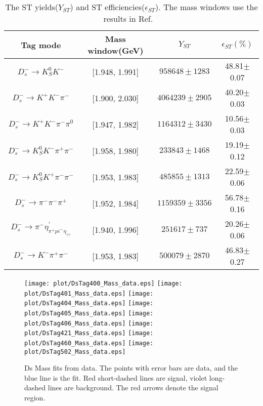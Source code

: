 \begin{table}
    \caption{ The ST yields($Y_{ST}$) and ST efficiencies($\epsilon_{ST}$). The mass windows use the results in Ref. ~\cite{Doc-DB-630-v35} }
    \label{ST-eff}
    \begin{center}
        \begin{tabular}{cccc}
            \toprule\toprule
            Tag mode & Mass window(GeV)  & $Y_{ST}$  & $\epsilon_{ST}(\%)$\\
            \hline
            $D_{s}^{-} \rightarrow K_{S}^{0}K^{-}$                          & [1.948, 1.991]    & $958648\pm1283$               & 48.81$\pm$0.07\\
            $D_{s}^{-} \rightarrow K^{+}K^{-}\pi^{-}$                       & [1.900, 2.030]    & $4064239\pm2905$              & 40.20$\pm$0.03\\
            $D_{s}^{-} \rightarrow K^{+}K^{-}\pi^{-}\pi^{0}$                & [1.947, 1.982]    & $1164312\pm3430$              & 10.56$\pm$0.03\\
            $D_{s}^{-} \rightarrow K_{S}^{0}K^{-}\pi^{+}\pi^{-}$            & [1.958, 1.980]    & $233843\pm1468$               & 19.19$\pm$0.12\\
            $D_{s}^{-} \rightarrow K_{S}^{0}K^{+}\pi^{-}\pi^{-}$            & [1.953, 1.983]    & $485855\pm1313$               & 22.59$\pm$0.06\\
            $D_{s}^{-} \rightarrow \pi^{-}\pi^{-}\pi^{+}$                   & [1.952, 1.984]    & $1159359\pm3356$              & 56.78$\pm$0.16\\
            $D_{s}^{-} \rightarrow \pi^{-}\eta_{\pi^{+}pi^{-}\eta_{\gamma\gamma}}^{'}$          & [1.940, 1.996]    & $251617\pm737$               & 20.26$\pm$0.06\\
            $D_{s}^{-} \rightarrow K^{-}\pi^{+}\pi^{-}$                     & [1.953, 1.983]    & $500079\pm2870$               & 46.83$\pm$0.27\\
            \bottomrule\bottomrule
        \end{tabular}
    \end{center}
\end{table}

\begin{figure*}[!htbp]
 \centering
 \texttt{[image: plot/DsTag400\_Mass\_data.eps]}
 \texttt{[image: plot/DsTag401\_Mass\_data.eps]}
 \texttt{[image: plot/DsTag404\_Mass\_data.eps]}
 \texttt{[image: plot/DsTag405\_Mass\_data.eps]}
 \texttt{[image: plot/DsTag406\_Mass\_data.eps]}
 \texttt{[image: plot/DsTag421\_Mass\_data.eps]}
 \texttt{[image: plot/DsTag460\_Mass\_data.eps]}
 \texttt{[image: plot/DsTag502\_Mass\_data.eps]}
 \caption{Ds Mass fits from data. The points with error bars are data, and the blue line is the fit. Red short-dashed lines are signal, violet long-dashed lines are background. The red arrows denote the signal region.  }
\label{SingleTagFit}
\end{figure*}


